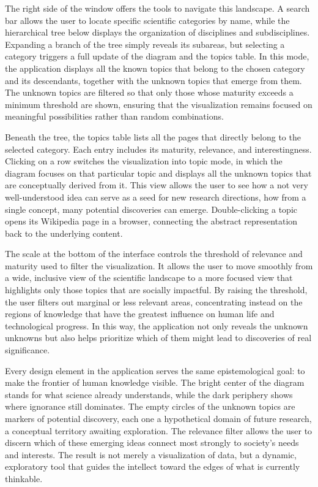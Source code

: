 The right side of the window offers the tools to navigate this landscape. A search bar allows the user to locate specific scientific categories by name, while the hierarchical tree below displays the organization of disciplines and subdisciplines. Expanding a branch of the tree simply reveals its subareas, but selecting a category triggers a full update of the diagram and the topics table. In this mode, the application displays all the known topics that belong to the chosen category and its descendants, together with the unknown topics that emerge from them. The unknown topics are filtered so that only those whose maturity exceeds a minimum threshold are shown, ensuring that the visualization remains focused on meaningful possibilities rather than random combinations.

Beneath the tree, the topics table lists all the pages that directly belong to the selected category. Each entry includes its maturity, relevance, and interestingness. Clicking on a row switches the visualization into topic mode, in which the diagram focuses on that particular topic and displays all the unknown topics that are conceptually derived from it. This view allows the user to see how a not very well-understood idea can serve as a seed for new research directions, how from a single concept, many potential discoveries can emerge. Double-clicking a topic opens its Wikipedia page in a browser, connecting the abstract representation back to the underlying content.

The scale at the bottom of the interface controls the threshold of relevance and maturity used to filter the visualization. It allows the user to move smoothly from a wide, inclusive view of the scientific landscape to a more focused view that highlights only those topics that are socially impactful. By raising the threshold, the user filters out marginal or less relevant areas, concentrating instead on the regions of knowledge that have the greatest influence on human life and technological progress. In this way, the application not only reveals the unknown unknowns but also helps prioritize which of them might lead to discoveries of real significance.

Every design element in the application serves the same epistemological goal: to make the frontier of human knowledge visible. The bright center of the diagram stands for what science already understands, while the dark periphery shows where ignorance still dominates. The empty circles of the unknown topics are markers of potential discovery, each one a hypothetical domain of future research, a conceptual territory awaiting exploration. The relevance filter allows the user to discern which of these emerging ideas connect most strongly to society’s needs and interests. The result is not merely a visualization of data, but a dynamic, exploratory tool that guides the intellect toward the edges of what is currently thinkable.


